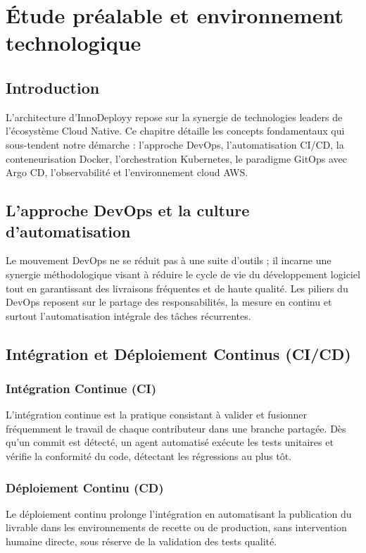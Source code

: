 \documentclass[12pt,a4paper,oneside]{report}
\begin{document}
\chapter{Étude préalable et environnement technologique}

\section{Introduction}
L'architecture d'InnoDeployy repose sur la synergie de technologies leaders de l'écosystème Cloud Native. Ce chapitre détaille les concepts fondamentaux qui sous-tendent notre démarche : l'approche DevOps, l'automatisation CI/CD, la conteneurisation Docker, l'orchestration Kubernetes, le paradigme GitOps avec Argo CD, l'observabilité et l'environnement cloud AWS.

\section{L'approche DevOps et la culture d'automatisation}
Le mouvement DevOps ne se réduit pas à une suite d'outils ; il incarne une synergie méthodologique visant à réduire le cycle de vie du développement logiciel tout en garantissant des livraisons fréquentes et de haute qualité. Les piliers du DevOps reposent sur le partage des responsabilités, la mesure en continu et surtout l'automatisation intégrale des tâches récurrentes.

\section{Intégration et Déploiement Continus (CI/CD)}
\subsection{Intégration Continue (CI)}
L'intégration continue est la pratique consistant à valider et fusionner fréquemment le travail de chaque contributeur dans une branche partagée. Dès qu'un commit est détecté, un agent automatisé exécute les tests unitaires et vérifie la conformité du code, détectant les régressions au plus tôt.

\subsection{Déploiement Continu (CD)}
Le déploiement continu prolonge l'intégration en automatisant la publication du livrable dans les environnements de recette ou de production, sans intervention humaine directe, sous réserve de la validation des tests qualité.
\end{document}
